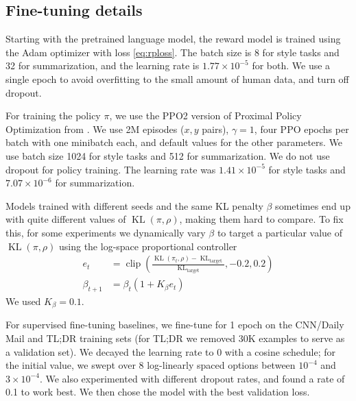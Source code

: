 \documentclass{article}
\newcommand{\KL}{\operatorname{KL}}
\newcommand{\clip}{\operatorname{clip}}
\begin{document}
\subsection{Fine-tuning details \label{sec:fine-tune}}

Starting with the pretrained language model, the reward model is trained using the Adam optimizer \citep{kingma2014adam} with loss \cref{eq:rploss}.  The batch size is 8 for style tasks and 32 for summarization, and the learning rate is $1.77\times 10^{-5}$ for both.  We use a single epoch to avoid overfitting to the small amount of human data, and turn off dropout.

For training the policy $\pi$, we use the PPO2 version of Proximal Policy Optimization from \citet{baselines}.  We use 2M episodes ($x,y$ pairs), $\gamma = 1$, four PPO epochs per batch with one minibatch each, and default values for the other parameters.  We use batch size 1024 for style tasks and 512 for summarization. We do not use dropout for policy training. The learning rate was $1.41\times 10^{-5}$ for style tasks and $7.07\times 10^{-6}$ for summarization.


Models trained with different seeds and the same KL penalty $\beta$ sometimes end up with quite different values of $\KL(\pi, \rho)$, making them hard to compare.  To fix this, for some experiments we dynamically vary $\beta$ to target a particular value of $\KL(\pi, \rho)$ using the log-space proportional controller
\begin{align*}
    e_t &= \clip\left(\frac{\KL(\pi_t, \rho) - \KL_{\mathrm{target}}}{\KL_{\mathrm{target}}}, -0.2, 0.2\right) \\
    \beta_{t+1} &= \beta_t( 1 + K_\beta e_t )
\end{align*}
We used $K_\beta = 0.1$.

For supervised fine-tuning baselines, we fine-tune for 1 epoch on the CNN/Daily Mail and TL;DR training sets (for TL;DR we removed 30K examples to serve as a validation set). We decayed the learning rate to 0 with a cosine schedule; for the initial value, we swept over 8 log-linearly spaced options between $10^{-4}$ and $3 \times 10^{-4}$. We also experimented with different dropout rates, and found a rate of 0.1 to work best.  We then chose the model with the best validation loss.  
\end{document}
